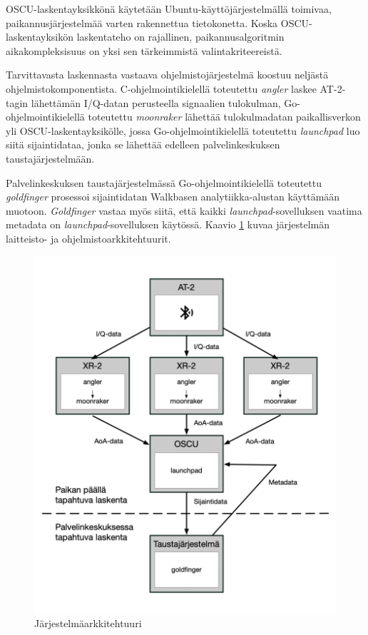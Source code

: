 \documentclass[
  12pt,
  a4paper, twoside]{book}
\begin{document}
OSCU-laskentayksikkönä käytetään Ubuntu-käyttöjärjestelmällä toimivaa, paikannusjärjestelmää varten rakennettua tietokonetta. Koska OSCU-laskentayksikön laskentateho on rajallinen, paikannusalgoritmin aikakompleksisuus on yksi sen tärkeimmistä valintakriteereistä.

Tarvittavasta laskennasta vastaava ohjelmistojärjestelmä koostuu neljästä ohjelmistokomponentista. C-ohjelmointikielellä toteutettu \emph{angler} laskee AT-2-tagin lähettämän I/Q-datan perusteella signaalien tulokulman, Go-ohjelmointikielellä toteutettu \emph{moonraker} lähettää tulokulmadatan paikallisverkon yli OSCU-laskentayksikölle, jossa Go-ohjelmointikielellä toteutettu \emph{launchpad} luo siitä sijaintidataa, jonka se lähettää edelleen palvelinkeskuksen taustajärjestelmään.

Palvelinkeskuksen taustajärjestelmässä Go-ohjelmointikielellä toteutettu \emph{goldfinger} prosessoi sijaintidatan Walkbasen analytiikka-alustan käyttämään muotoon. \emph{Goldfinger} vastaa myös siitä, että kaikki \emph{launchpad}-sovelluksen vaatima metadata on \emph{launchpad}-sovelluksen käytössä. Kaavio \ref{fig:jarjestelmaarkkitehtuuri} kuvaa järjestelmän laitteisto- ja ohjelmistoarkkitehtuurit.

\begin{figure}[H]
\centering
\includegraphics[width=15cm]{jarjestelmaarkkitehtuuri}
\caption{Järjestelmäarkkitehtuuri}
\label{fig:jarjestelmaarkkitehtuuri}
\end{figure}
\end{document}
